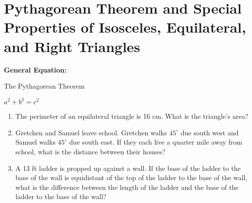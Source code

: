 \section[Special Triangles]{Pythagorean Theorem and Special Properties of Isosceles, Equilateral, and Right Triangles}

\textbf{General Equation:}

\begin{center}
The Pythagorean Theorem

$a^2+b^2=c^2$
\end{center}

\vfill
\begin{enumerate}[labelindent=*,style=multiline,leftmargin=*,label=\textbf{Example \arabic*:}]
\item The perimeter of an equilateral triangle is 16 cm. What is the triangle's area?

\vfill\item Gretchen and Samuel leave school. Gretchen walks $45^\circ$ due south west and Samuel walks $45^\circ$ due south east. If they each live a quarter mile away from school, what is the distance between their houses?

\vfill\item A 13 ft ladder is propped up against a wall. If the base of the ladder to the base of the wall is equidistant of the top of the ladder to the base of the wall, what is the difference between the length of the ladder and the base of the ladder to the base of the wall?
\end{enumerate}

